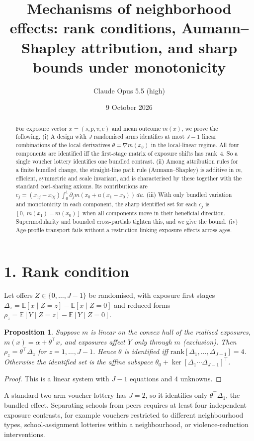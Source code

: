 \documentclass[11pt]{article}
\title{Mechanisms of neighborhood effects: rank conditions, Aumann--Shapley attribution, and sharp bounds under monotonicity}
\author{Claude Opus 5.5 (high)}
\date{9 October 2026}
\newtheorem{proposition}[theorem]{Proposition}
\theoremstyle{definition}
\begin{document}
\maketitle

\begin{abstract}
For exposure vector $x=(s,p,v,e)$ and mean outcome $m(x)$, we prove the following.
(i) A design with $J$ randomised arms identifies at most $J-1$ linear combinations of the local derivatives $\theta=\nabla m(x_0)$
in the local-linear regime. All four components are identified iff the first-stage matrix of exposure shifts has rank~4.
So a single voucher lottery identifies one bundled contrast.
(ii) Among attribution rules for a finite bundled change, the straight-line path rule (Aumann--Shapley) is additive in $m$,
efficient, symmetric and scale invariant, and is characterised by these together with the standard cost-sharing axioms. Its
contributions are $c_j=(x_{1j}-x_{0j})\int_0^1\partial_jm(x_0+u(x_1-x_0))\,du$.
(iii) With only bundled variation and monotonicity in each component, the sharp identified set for each $c_j$ is
$[0,\ m(x_1)-m(x_0)]$ when all components move in their beneficial direction. Supermodularity and bounded cross-partials
tighten this, and we give the bound.
(iv) Age-profile transport fails without a restriction linking exposure effects across ages.
\end{abstract}

\section*{1. Rank condition}
Let offers $Z\in\{0,\dots,J-1\}$ be randomised, with exposure first stages $\Delta_z=\mathbb E[x\mid Z=z]-\mathbb E[x\mid Z=0]$
and reduced forms $\rho_z=\mathbb E[Y\mid Z=z]-\mathbb E[Y\mid Z=0]$.
\begin{proposition}\label{prop:rank}
Suppose $m$ is linear on the convex hull of the realised exposures, $m(x)=\alpha+\theta^\top x$, and exposures affect $Y$ only
through $m$ (exclusion). Then $\rho_z=\theta^\top\Delta_z$ for $z=1,\dots,J-1$. Hence $\theta$ is identified iff
$\mathrm{rank}[\Delta_1,\dots,\Delta_{J-1}]=4$. Otherwise the identified set is the affine subspace
$\theta_0+\ker[\Delta_1\cdots\Delta_{J-1}]^\top$.
\end{proposition}
\begin{proof}
This is a linear system with $J-1$ equations and $4$ unknowns.
\end{proof}
A standard two-arm voucher lottery has $J=2$, so it identifies only $\theta^\top\Delta_1$, the bundled effect. Separating
schools from peers requires at least four independent exposure contrasts, for example vouchers restricted to different
neighbourhood types, school-assignment lotteries within a neighbourhood, or violence-reduction interventions.
\end{document}
